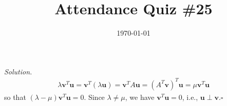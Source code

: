 \documentclass{homework}
\title{Attendance Quiz \#25}
\date{\today}
\begin{document}
\maketitle

\newcommand{\row}{\operatorname{row}}
\newcommand{\col}{\operatorname{col}}
\newcommand{\rk}{\operatorname{rk}}
\newcommand{\nll}{\operatorname{null}}
\newcommand{\diag}{\operatorname{diag}}
\newcommand{\nullity}{\operatorname{nullity}}
\newcommand{\tr}{\operatorname{tr}}

\noindent\textit{Solution.}
\begin{align*}
    \lambda\mathbf v^T\mathbf u = \mathbf v^T (\lambda\mathbf u) = \mathbf v^T A\mathbf u = (A^T\mathbf v)^T\mathbf u = \mu\mathbf v^T\mathbf u
\end{align*}
so that $(\lambda-\mu)\mathbf v^T\mathbf u = 0$. Since $\lambda\ne \mu$, we have $\mathbf v^T\mathbf u = 0$, i.e., $\mathbf u\perp\mathbf v$.\hfill$\square$
\end{document}
